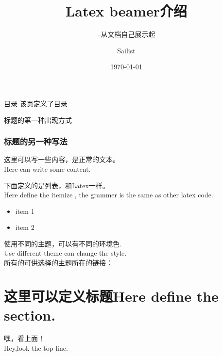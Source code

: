 \documentclass{beamer}
\begin{document}
        \begin{frame}
            \title[Android的介绍]{Latex beamer介绍}
            \subtitle {--从文档自己展示起}
            \author{Sailist}
            \date{\today}
            \titlepage %
        \end{frame}
        
        \begin{frame}{目录}
            该页定义了目录

            \tableofcontents
        \end{frame}

        \begin{frame}{标题的第一种出现方式}
        \end{frame}

        \begin{frame}
            \frametitle{标题的另一种写法}
        \end{frame}
        
        \begin{frame}
            这里可以写一些内容，是正常的文本。\\
            Here can write some content.
        \end{frame} 
        
        \begin{frame}
            下面定义的是列表，和Latex一样。\\
            Here define the itemize , the grammer is the same as other latex code.
            \begin{itemize}
                \item item 1
                \item item 2
            \end{itemize}
        \end{frame} 
        
        \begin{frame}
            使用不同的主题，可以有不同的环境色.\\
            Use different theme can change the style.\\
            所有的可供选择的主题所在的链接：\\
        \end{frame}

        \section{这里可以定义标题Here define the section.}
        \begin{frame}
            
            嘿，看上面！\\
            Hey,look the top line.

        \end{frame}
\end{document}
